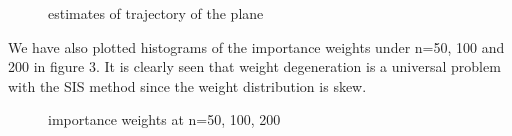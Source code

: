 \documentclass{article}
\begin{document}
\begin{figure}[h]
        \caption{\label{2} estimates of trajectory of the plane}
    \end{figure}



We have also plotted histograms of the importance weights under n=50, 100 and 200 in figure 3. It is clearly seen that weight degeneration is a universal problem with the SIS method since the weight distribution is skew. 

\begin{figure}[h]
        \caption{\label{3} importance weights at n=50, 100, 200}
    \end{figure}
\end{document}
